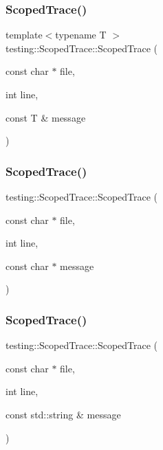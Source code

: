 \subsubsection{\texorpdfstring{Scoped\+Trace()}{ScopedTrace()}\hspace{0.1cm}{\footnotesize\ttfamily [1/3]}}
{\footnotesize\ttfamily template$<$typename T $>$ \\
testing\+::\+Scoped\+Trace\+::\+Scoped\+Trace (\begin{DoxyParamCaption}\item[{const char $\ast$}]{file,  }\item[{int}]{line,  }\item[{const T \&}]{message }\end{DoxyParamCaption})\hspace{0.3cm}{\ttfamily [inline]}}

\mbox{\label{classtesting_1_1ScopedTrace_accd2a06cc941ffd7d6fe109adfdb4f19}} 
\subsubsection{\texorpdfstring{Scoped\+Trace()}{ScopedTrace()}\hspace{0.1cm}{\footnotesize\ttfamily [2/3]}}
{\footnotesize\ttfamily testing\+::\+Scoped\+Trace\+::\+Scoped\+Trace (\begin{DoxyParamCaption}\item[{const char $\ast$}]{file,  }\item[{int}]{line,  }\item[{const char $\ast$}]{message }\end{DoxyParamCaption})\hspace{0.3cm}{\ttfamily [inline]}}

\mbox{\label{classtesting_1_1ScopedTrace_a1f453a2aade0db6955a111a7cb329615}} 
\subsubsection{\texorpdfstring{Scoped\+Trace()}{ScopedTrace()}\hspace{0.1cm}{\footnotesize\ttfamily [3/3]}}
{\footnotesize\ttfamily testing\+::\+Scoped\+Trace\+::\+Scoped\+Trace (\begin{DoxyParamCaption}\item[{const char $\ast$}]{file,  }\item[{int}]{line,  }\item[{const std\+::string \&}]{message }\end{DoxyParamCaption})\hspace{0.3cm}{\ttfamily [inline]}}

